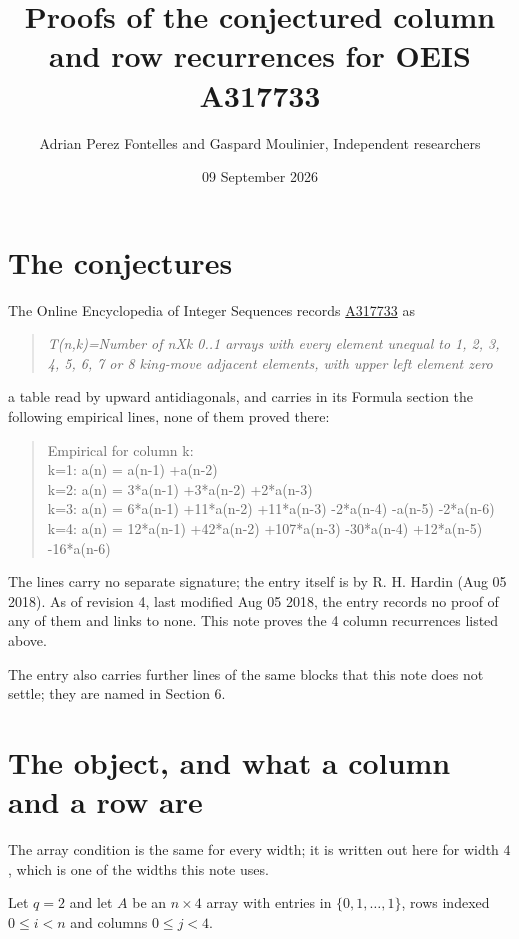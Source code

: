 \documentclass[11pt]{article}
\title{Proofs of the conjectured column and row recurrences for OEIS A317733}
\author{Adrian Perez Fontelles and Gaspard Moulinier, Independent researchers}
\date{09 September 2026}
\theoremstyle{definition}
\begin{document}
\maketitle
\section{The conjectures}

The Online Encyclopedia of Integer Sequences records \href{https://oeis.org/A317733}{A317733} as

\begin{quote}\itshape T(n,k)=Number of nXk 0..1 arrays with every element unequal to 1, 2, 3, 4, 5, 6, 7 or 8 king-move adjacent elements, with upper left element zero\end{quote}

a table read by upward antidiagonals, and carries in its Formula section the following empirical lines, none of them proved there:

\begin{quote}\ttfamily Empirical for column k:\\
k=1: a(n) = a(n-1) +a(n-2)\\k=2: a(n) = 3*a(n-1) +3*a(n-2) +2*a(n-3)\\k=3: a(n) = 6*a(n-1) +11*a(n-2) +11*a(n-3) -2*a(n-4) -a(n-5) -2*a(n-6)\\k=4: a(n) = 12*a(n-1) +42*a(n-2) +107*a(n-3) -30*a(n-4) +12*a(n-5) -16*a(n-6)\end{quote}

The lines carry no separate signature; the entry itself is by R. H. Hardin (Aug 05 2018). As of revision 4, last modified Aug 05 2018, the entry records no proof of any of them and links to none. This note proves the 4 column recurrences listed above.

The entry also carries further lines of the same blocks that this note does not settle; they are named in Section 6.

\section{The object, and what a column and a row are}

The array condition is the same for every width; it is written out here for width $4$, which is one of the widths this note uses.

Let $q = 2$ and let $A$ be an $n \times 4$ array with entries in $\{0,1,\dots,1\}$, rows indexed $0 \le i < n$ and columns $0 \le j < 4$.
\end{document}
